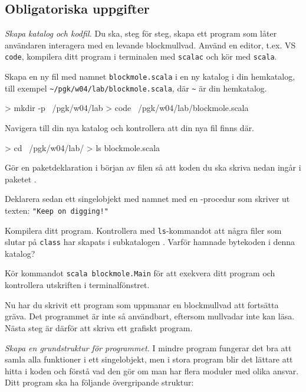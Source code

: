 \subsection{Obligatoriska uppgifter}


\Task \emph{Skapa katalog och kodfil.}
Du ska, steg för steg, skapa ett program som låter användaren interagera med en levande blockmullvad. Använd en editor, t.ex. VS \texttt{code}, kompilera ditt program i terminalen med \texttt{scalac} och kör med \texttt{scala}.

\Subtask
Skapa en ny fil med namnet \texttt{blockmole.scala} i en ny katalog i din hemkatalog, till exempel \texttt{\textasciitilde/pgk/w04/lab/blockmole.scala}, där \texttt{\textasciitilde} är din hemkatalog.
\begin{REPLnonum}
> mkdir -p ~/pgk/w04/lab
> code ~/pgk/w04/lab/blockmole.scala
\end{REPLnonum}


\Subtask
Navigera till din nya katalog och kontrollera att din nya fil finns där.
\begin{REPLnonum}
> cd ~/pgk/w04/lab/
> ls
blockmole.scala
\end{REPLnonum}

\Subtask
Gör en paketdeklaration i början av filen  så att koden du ska skriva nedan ingår i paketet .

\Subtask
Deklarera sedan ett singelobjekt med namnet  med en -procedur som skriver ut texten: \texttt{"Keep on digging!"}

\Subtask
Kompilera ditt program. Kontrollera med \texttt{ls}-kommandot att några filer som slutar på \texttt{class} har skapats i subkatalogen . \Pen Varför hamnade bytekoden i denna katalog?

\Subtask
Kör kommandot \texttt{scala blockmole.Main} för att exekvera ditt program och kontrollera utskriften i terminalfönstret.

\vspace{1em}\noindent Nu har du skrivit ett program som uppmanar en blockmullvad att fortsätta gräva. Det programmet är inte så användbart, eftersom mullvadar inte kan läsa. Nästa steg är därför att skriva ett grafiskt program.%



\Task \emph{Skapa en grundstruktur för programmet.}
I mindre program fungerar det bra att samla alla funktioner i ett singelobjekt, men i stora program blir det lättare att hitta i koden och förstå vad den gör om man har flera moduler med olika ansvar. Ditt program ska ha följande övergripande struktur:

